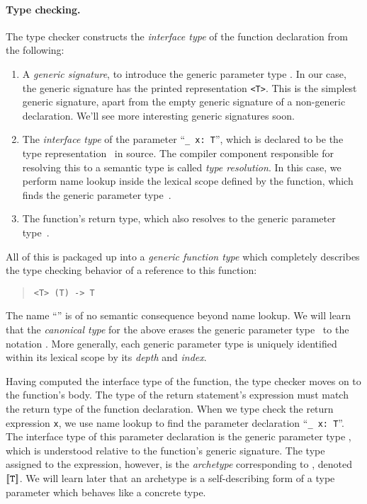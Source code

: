 \documentclass[../generics]{subfiles}
\begin{document}
\paragraph{Type checking.} The type checker constructs the \emph{interface type} of the function declaration from the following:
\begin{enumerate}
\item A \emph{generic signature}, to introduce the generic parameter type \tT. In our case, the generic signature has the printed representation \texttt{<T>}. This is the simplest generic signature, apart from the empty generic signature of a non-generic declaration. We'll see more interesting generic signatures soon.

\item The \emph{interface type} of the parameter ``\verb|_ x: T|'', which is declared to be the type representation \tT\ in source. The compiler component responsible for resolving this to a semantic type is called \emph{type resolution}. In this case, we perform name lookup inside the lexical scope defined by the function, which finds the generic parameter type~\tT.

\item The function's return type, which also resolves to the generic parameter type~\tT.
\end{enumerate}
All of this is packaged up into a \emph{generic function type} which completely describes the type checking behavior of a reference to this function:
\begin{quote}
\begin{verbatim}
<T> (T) -> T
\end{verbatim}
\end{quote}
The name ``\tT'' is of no semantic consequence beyond name lookup. We will learn that the \emph{canonical type} for the above erases the generic parameter type \tT\ to the notation . More generally, each generic parameter type is uniquely identified within its lexical scope by its \emph{depth} and \emph{index}.

Having computed the interface type of the function, the type checker moves on to the function's body. The type of the return statement's expression must match the return type of the function declaration. When we type check the return expression \texttt{x}, we use name lookup to find the parameter declaration ``\verb|_ x: T|''. The interface type of this parameter declaration is the generic parameter type \tT, which is understood relative to the function's generic signature. The type assigned to the expression, however, is the \emph{archetype} corresponding to \tT, denoted $[\![\texttt{T}]\!]$. We will learn later that an archetype is a self-describing form of a type parameter which behaves like a concrete type.
\end{document}

